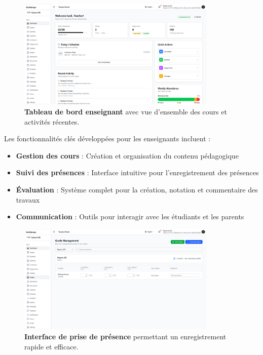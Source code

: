 \begin{figure}[H]
  \centering
  \includegraphics[width=0.85\textwidth,keepaspectratio]{pfe-pics/teacher/Screenshot 2025-06-09 at 22-51-23 Vite React TS.png}
  \caption{\textbf{Tableau de bord enseignant} avec vue d'ensemble des cours et activités récentes.}
  \label{fig:teacher_dashboard}
\end{figure}

Les fonctionnalités clés développées pour les enseignants incluent :

\begin{itemize}
  \item \textbf{Gestion des cours} : Création et organisation du contenu pédagogique
  
  \item \textbf{Suivi des présences} : Interface intuitive pour l'enregistrement des présences
  
  \item \textbf{Évaluation} : Système complet pour la création, notation et commentaire des travaux
  
  \item \textbf{Communication} : Outils pour interagir avec les étudiants et les parents
\end{itemize}

\begin{figure}[H]
  \centering
  \includegraphics[width=0.85\textwidth,keepaspectratio]{pfe-pics/teacher/Screenshot 2025-06-09 at 22-53-59 Vite React TS.png}
  \caption{\textbf{Interface de prise de présence} permettant un enregistrement rapide et efficace.}
  \label{fig:attendance_taking}
\end{figure}


